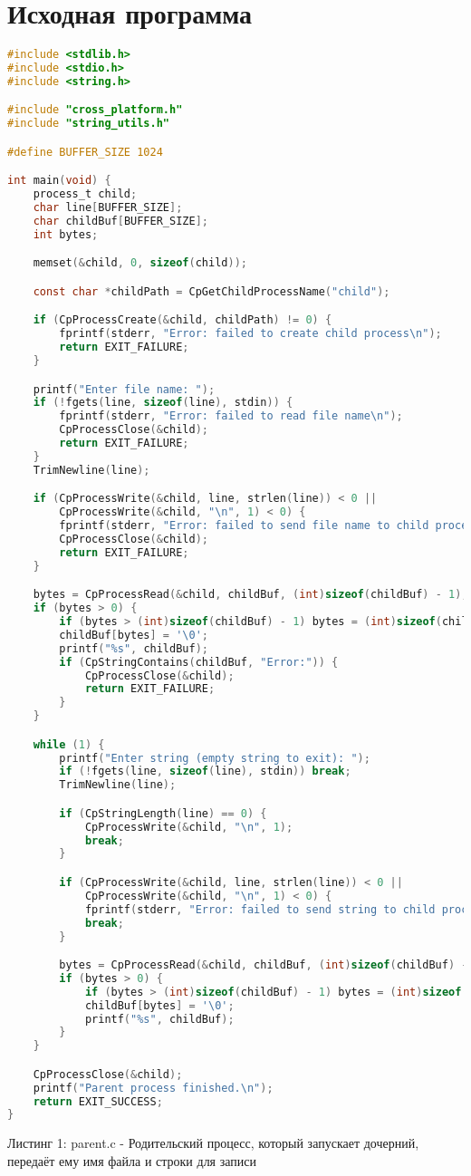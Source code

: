 \section{Исходная программа}

\begin{lstlisting}[language=C]
#include <stdlib.h>
#include <stdio.h>
#include <string.h>

#include "cross_platform.h"
#include "string_utils.h"

#define BUFFER_SIZE 1024

int main(void) {
    process_t child;
    char line[BUFFER_SIZE];
    char childBuf[BUFFER_SIZE];
    int bytes;

    memset(&child, 0, sizeof(child));

    const char *childPath = CpGetChildProcessName("child");

    if (CpProcessCreate(&child, childPath) != 0) {
        fprintf(stderr, "Error: failed to create child process\n");
        return EXIT_FAILURE;
    }

    printf("Enter file name: ");
    if (!fgets(line, sizeof(line), stdin)) {
        fprintf(stderr, "Error: failed to read file name\n");
        CpProcessClose(&child);
        return EXIT_FAILURE;
    }
    TrimNewline(line);

    if (CpProcessWrite(&child, line, strlen(line)) < 0 ||
        CpProcessWrite(&child, "\n", 1) < 0) {
        fprintf(stderr, "Error: failed to send file name to child process\n");
        CpProcessClose(&child);
        return EXIT_FAILURE;
    }

    bytes = CpProcessRead(&child, childBuf, (int)sizeof(childBuf) - 1);
    if (bytes > 0) {
        if (bytes > (int)sizeof(childBuf) - 1) bytes = (int)sizeof(childBuf) - 1;
        childBuf[bytes] = '\0';
        printf("%s", childBuf);
        if (CpStringContains(childBuf, "Error:")) {
            CpProcessClose(&child);
            return EXIT_FAILURE;
        }
    }

    while (1) {
        printf("Enter string (empty string to exit): ");
        if (!fgets(line, sizeof(line), stdin)) break;
        TrimNewline(line);

        if (CpStringLength(line) == 0) {
            CpProcessWrite(&child, "\n", 1);
            break;
        }

        if (CpProcessWrite(&child, line, strlen(line)) < 0 ||
            CpProcessWrite(&child, "\n", 1) < 0) {
            fprintf(stderr, "Error: failed to send string to child process\n");
            break;
        }

        bytes = CpProcessRead(&child, childBuf, (int)sizeof(childBuf) - 1);
        if (bytes > 0) {
            if (bytes > (int)sizeof(childBuf) - 1) bytes = (int)sizeof(childBuf) - 1;
            childBuf[bytes] = '\0';
            printf("%s", childBuf);
        }
    }

    CpProcessClose(&child);
    printf("Parent process finished.\n");
    return EXIT_SUCCESS;
}
\end{lstlisting}
Листинг 1: parent.c - Родительский процесс, который запускает дочерний, передаёт ему имя файла и строки для записи

